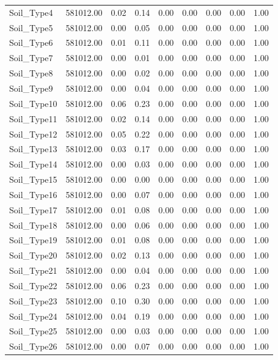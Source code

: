 \begin{longtable}{lrrrrrrrr}
Soil\_Type4 & 581012.00 & 0.02 & 0.14 & 0.00 & 0.00 & 0.00 & 0.00 & 1.00 \\
Soil\_Type5 & 581012.00 & 0.00 & 0.05 & 0.00 & 0.00 & 0.00 & 0.00 & 1.00 \\
Soil\_Type6 & 581012.00 & 0.01 & 0.11 & 0.00 & 0.00 & 0.00 & 0.00 & 1.00 \\
Soil\_Type7 & 581012.00 & 0.00 & 0.01 & 0.00 & 0.00 & 0.00 & 0.00 & 1.00 \\
Soil\_Type8 & 581012.00 & 0.00 & 0.02 & 0.00 & 0.00 & 0.00 & 0.00 & 1.00 \\
Soil\_Type9 & 581012.00 & 0.00 & 0.04 & 0.00 & 0.00 & 0.00 & 0.00 & 1.00 \\
Soil\_Type10 & 581012.00 & 0.06 & 0.23 & 0.00 & 0.00 & 0.00 & 0.00 & 1.00 \\
Soil\_Type11 & 581012.00 & 0.02 & 0.14 & 0.00 & 0.00 & 0.00 & 0.00 & 1.00 \\
Soil\_Type12 & 581012.00 & 0.05 & 0.22 & 0.00 & 0.00 & 0.00 & 0.00 & 1.00 \\
Soil\_Type13 & 581012.00 & 0.03 & 0.17 & 0.00 & 0.00 & 0.00 & 0.00 & 1.00 \\
Soil\_Type14 & 581012.00 & 0.00 & 0.03 & 0.00 & 0.00 & 0.00 & 0.00 & 1.00 \\
Soil\_Type15 & 581012.00 & 0.00 & 0.00 & 0.00 & 0.00 & 0.00 & 0.00 & 1.00 \\
Soil\_Type16 & 581012.00 & 0.00 & 0.07 & 0.00 & 0.00 & 0.00 & 0.00 & 1.00 \\
Soil\_Type17 & 581012.00 & 0.01 & 0.08 & 0.00 & 0.00 & 0.00 & 0.00 & 1.00 \\
Soil\_Type18 & 581012.00 & 0.00 & 0.06 & 0.00 & 0.00 & 0.00 & 0.00 & 1.00 \\
Soil\_Type19 & 581012.00 & 0.01 & 0.08 & 0.00 & 0.00 & 0.00 & 0.00 & 1.00 \\
Soil\_Type20 & 581012.00 & 0.02 & 0.13 & 0.00 & 0.00 & 0.00 & 0.00 & 1.00 \\
Soil\_Type21 & 581012.00 & 0.00 & 0.04 & 0.00 & 0.00 & 0.00 & 0.00 & 1.00 \\
Soil\_Type22 & 581012.00 & 0.06 & 0.23 & 0.00 & 0.00 & 0.00 & 0.00 & 1.00 \\
Soil\_Type23 & 581012.00 & 0.10 & 0.30 & 0.00 & 0.00 & 0.00 & 0.00 & 1.00 \\
Soil\_Type24 & 581012.00 & 0.04 & 0.19 & 0.00 & 0.00 & 0.00 & 0.00 & 1.00 \\
Soil\_Type25 & 581012.00 & 0.00 & 0.03 & 0.00 & 0.00 & 0.00 & 0.00 & 1.00 \\
Soil\_Type26 & 581012.00 & 0.00 & 0.07 & 0.00 & 0.00 & 0.00 & 0.00 & 1.00 \\

\end{longtable}
